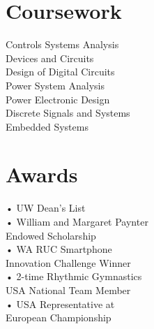 \documentclass[]{hieudo-build}
\begin{document}
\begin{minipage}[t]{0.36\textwidth}
\section{Coursework}
Controls Systems Analysis \\
Devices and Circuits\\
Design of Digital Circuits \\
Power System Analysis \\
Power Electronic Design \\
Discrete Signals and Systems\\
Embedded Systems
\sectionsep



\section{Awards} 
• UW Dean's List\\
• William and Margaret Paynter\\
\hspace{1.5 mm} Endowed Scholarship\\
• WA RUC Smartphone \\
\hspace{1.5 mm} Innovation Challenge Winner\\
• 2-time Rhythmic Gymnastics\\
\hspace{1.5 mm} USA National Team Member\\
• USA Representative at \\
\hspace{1.5 mm} European Championship\\
\sectionsep


%
%
\end{minipage} 
\hfill
\end{document}
